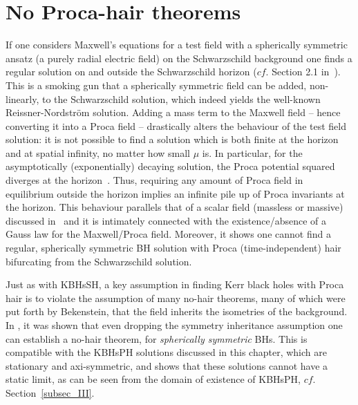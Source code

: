 \section{No Proca-hair theorems}
\label{sec_nohair}
If one considers Maxwell's equations for a test field with a spherically symmetric ansatz (a purely radial electric field) on the Schwarzschild background one finds a regular solution on and outside the Schwarzschild horizon ($cf.$ Section 2.1 in~\cite{Herdeiro:2015waa}). This is a smoking gun that a spherically symmetric field can be added, non-linearly, to the Schwarzschild solution, which indeed yields the well-known Reissner-Nordstr\"om solution. 
Adding a mass term to the Maxwell field -- hence converting it into a Proca field -- drastically alters the behaviour of the test field solution: it is not possible to find a solution which is both finite at the horizon and at spatial infinity, no matter how small $\mu$ is. 
In particular, for the asymptotically (exponentially) decaying solution, the Proca potential squared diverges at the horizon~\cite{Gottlieb:1984jg}.
Thus, requiring any amount of Proca field in equilibrium outside the horizon implies an infinite pile up of Proca invariants at the horizon.
This behaviour parallels that of a scalar field (massless or massive) discussed in~\cite{Herdeiro:2015waa} and it is intimately connected with the existence/absence of a Gauss law for the Maxwell/Proca field.
Moreover, it shows one cannot find a regular, spherically symmetric BH solution with Proca (time-independent) hair bifurcating from the Schwarzschild solution.

Just as with KBHsSH, a key assumption in finding Kerr black holes with Proca hair is to violate the assumption of many no-hair theorems, many of which were put forth by Bekenstein\cite{Bekenstein:1971hc,Bekenstein:1972ky}, that the field inherits the isometries of the background.
In \cite{Herdeiro:2016tmi}, it was shown that even dropping the symmetry inheritance assumption one can establish a no-hair theorem, for \textit{spherically symmetric} BHs.
This is compatible with the KBHsPH solutions discussed in this chapter, which are stationary and axi-symmetric, and shows that these solutions cannot have a static limit,
as can be seen from the domain of existence of KBHsPH, $cf.$ Section~\ref{subsec_III}.

